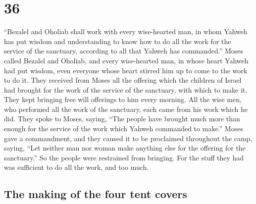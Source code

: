 \hypertarget{section-35}{%
\section{36}\label{section-35}}

 ``Bezalel and Oholiab shall work with every wise-hearted
man, in whom Yahweh has put wisdom and understanding to know how to do
all the work for the service of the sanctuary, according to all that
Yahweh has commanded.''  Moses called Bezalel and Oholiab,
and every wise-hearted man, in whose heart Yahweh had put wisdom, even
everyone whose heart stirred him up to come to the work to do it.
 They received from Moses all the offering which the
children of Israel had brought for the work of the service of the
sanctuary, with which to make it. They kept bringing free will offerings
to him every morning.  All the wise men, who performed all
the work of the sanctuary, each came from his work which he did.
 They spoke to Moses, saying, ``The people have brought
much more than enough for the service of the work which Yahweh commanded
to make.''  Moses gave a commandment, and they caused it
to be proclaimed throughout the camp, saying, ``Let neither man nor
woman make anything else for the offering for the sanctuary.'' So the
people were restrained from bringing.  For the stuff they
had was sufficient to do all the work, and too much.

\hypertarget{the-making-of-the-four-tent-covers}{%
\subsection{The making of the four tent
covers}\label{the-making-of-the-four-tent-covers}}

